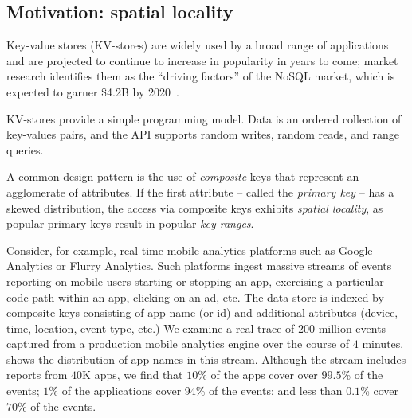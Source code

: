 \subsection{Motivation: spatial locality} 
Key-value stores (KV-stores) are widely used  by a broad range of applications and are projected
to continue to increase in popularity in years to come; market research  identifies them as the 
``driving factors'' of the NoSQL market, which is expected to garner \$4.2B by 2020~\cite{alliedmarketresearch}.

KV-stores provide a simple programming model. 
Data is an ordered collection of key-values pairs, and  the API supports random writes, 
random reads, and range queries. 

A common design pattern is the use of \emph{composite} keys that represent an agglomerate of attributes.
If the first attribute -- called the \emph{primary key} -- has a skewed distribution, the access via composite keys exhibits \emph{spatial locality}, as 
popular primary keys result in popular \emph{key ranges}. 

Consider, for example,  real-time mobile analytics platforms such as Google Analytics or Flurry Analytics.   
Such platforms ingest massive streams of events reporting   
on mobile users starting or stopping an app, exercising a particular code path within an app,  clicking on an ad, etc. 
The data store is indexed by composite keys consisting of  app name (or id) and additional attributes (device, time, location, event type, etc.) 
We examine a real trace of  $200$ million events captured from a production mobile analytics engine over the course of $4$ minutes.  
 shows the distribution of app names in this stream.  
Although the stream includes reports from $40$K apps, 
we find that $10$\% of the apps cover over $99.5$\% of the events; $1$\% of the applications cover $94$\% of the events; and less than $0.1$\% cover $70$\% of the events. 



